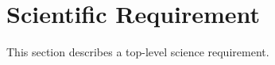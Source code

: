 \section{Scientific Requirement 
\label{sec:sci_req}}

This section describes a top-level science requirement. 